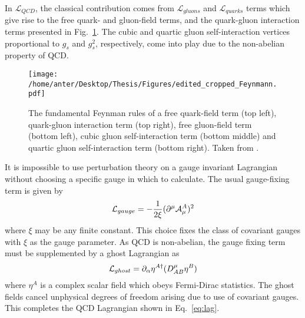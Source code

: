 In $\mathcal{L}_{QCD}$, the classical contribution comes from $\mathcal{L}_{gluons}$ and $\mathcal{L}_{quarks}$ terms which give rise to the free quark- and gluon-field terms, and the quark-gluon interaction terms presented in Fig.~\ref{fig:feyn}. The cubic and quartic gluon self-interaction vertices proportional to $g_s$ and $g^2_s$, respectively, come into play due to the non-abelian property of QCD.

\begin{figure}[!h]
\begin{center}
\hspace*{-1.3mm}

\texttt{[image: /home/anter/Desktop/Thesis/Figures/edited\_cropped\_Feynmann.pdf]}\\
\vspace*{4mm}
\caption[The fundamental Feynman rules of QCD.]{The fundamental Feynman rules of a free quark-field term (top left), quark-gluon interaction term (top right), free gluon-field term (bottom left), cubic gluon self-interaction term (bottom middle) and quartic gluon self-interaction term (bottom right). Taken from \cite{Rabbertz:2017ssq}.}
\label{fig:feyn}
\end{center}
\end{figure}

It is impossible to use perturbation theory on a gauge invariant Lagrangian without choosing a specific gauge in which to calculate. The usual gauge-fixing term is given by 
\begin{equation}
{\cal L}_{gauge}=-\frac{1}{2\xi} (\partial^{\mu}{\cal A}^{A}_{\mu})^{2}
\label{eq:gauge-fixing}
\end{equation}
where $\xi$ may be any finite constant. This choice fixes the class of covariant gauges with $\xi$ as the gauge parameter. As QCD is non-abelian, the gauge fixing term must be supplemented by a ghost Lagrangian as
\begin{equation}
{\cal L}_{ghost}=\partial_{\alpha}\eta^{A\dagger}(D^{\mu}_{AB}\eta^{B})
\label{eq:ghost}
\end{equation}
where $\eta^{A}$ is a complex scalar field which obeys Fermi-Dirac statistics. The ghost fields cancel unphysical degrees of freedom arising due to use of covariant gauges. This completes the QCD Lagrangian shown in Eq.~\ref{eq:lag}.

